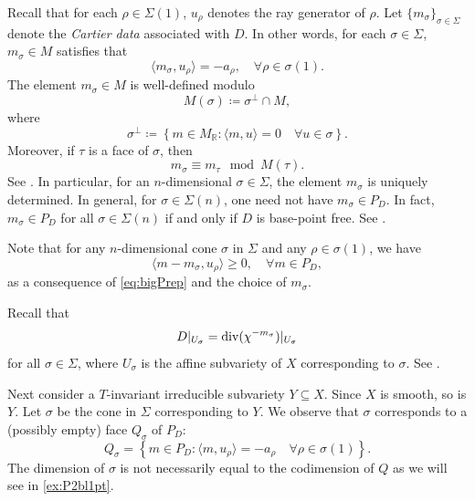 Recall that for each $\rho\in \Sigma(1)$, $u_{\rho}$ denotes the ray generator of $\rho$.
Let $\{m_{\sigma}\}_{\sigma\in \Sigma}$ denote the \emph{Cartier data} associated with $D$. In other words, for each $\sigma\in \Sigma$, $m_{\sigma}\in M$ satisfies that
\[
\langle m_{\sigma},u_{\rho} \rangle =-a_{\rho},\quad \forall \rho\in \sigma(1).
\]
The element $m_{\sigma}\in M$ is well-defined modulo
\begin{equation}\label{eq:Msigmadef}
    M(\sigma)\coloneqq \sigma^{\perp}\cap M,
\end{equation}
where
\[
\sigma^{\perp}\coloneqq \left\{ m\in M_{\mathbb{R}} : \langle m,u\rangle=0 \quad\forall u\in \sigma \right\}.
\]
Moreover, if $\tau$ is a face of $\sigma$, then
\begin{equation}\label{eq:Cartierdatalowdim}
m_{\sigma}\equiv m_{\tau} \mod M(\tau).
\end{equation}
See \cite[Theorem~4.2.8]{CLS11}. In particular, for an $n$-dimensional $\sigma\in \Sigma$, the element $m_{\sigma}$ is uniquely determined. In general, for $\sigma\in \Sigma(n)$, one need not have $m_{\sigma}\in P_D$. In fact, $m_{\sigma}\in P_D$ for all $\sigma\in \Sigma(n)$ if and only if $D$ is base-point free. See \cite[Theorem~6.1.7]{CLS11}.

Note that for any $n$-dimensional cone $\sigma$ in $\Sigma$ and any $\rho\in \sigma(1)$, we have
\begin{equation}\label{eq:mmsigpos}
    \langle m-m_{\sigma},u_{\rho} \rangle \geq 0,\quad \forall m\in P_D,
\end{equation}
as a consequence of \eqref{eq:bigPrep} and the choice of $m_\sigma$.

Recall that
\begin{equation}\label{eq:DUsigma}
D|_{U_{\sigma}}=\operatorname{div}(\chi^{-m_{\sigma}})|_{U_{\sigma}}
\end{equation}
for all $\sigma\in \Sigma$, where $U_{\sigma}$ is the affine subvariety of $X$ corresponding to $\sigma$. See \cite[Proposition~4.1.2]{CLS11}.


Next consider a $T$-invariant irreducible subvariety $Y\subseteq X$. Since $X$ is smooth, so is $Y$. Let $\sigma$ be the cone in $\Sigma$ corresponding to $Y$.
We observe that $\sigma$ corresponds to a (possibly empty) face $Q_{\sigma}$ of $P_D$:
\begin{equation}\label{eq:Qsigma}
Q_{\sigma}=\left\{m\in P_D: \langle m,u_{\rho}\rangle=-a_{\rho}\quad \forall \rho\in \sigma(1) \right\}.
\end{equation}
The dimension of $\sigma$ is not necessarily equal to the codimension of $Q$ as we will see in \cref{ex:P2bl1pt}.


